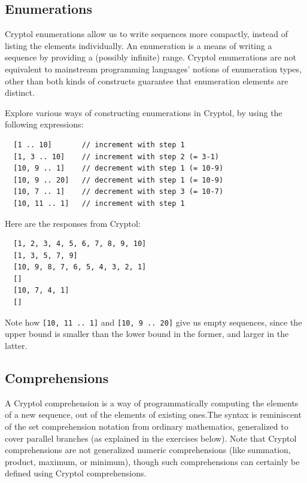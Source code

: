 \subsection{Enumerations}\indEnum
\label{sec:enumerations}

Cryptol enumerations allow us to write sequences more compactly,
instead of listing the elements individually.  An enumeration is a
means of writing a sequence by providing a (possibly infinite) range.
Cryptol enumerations are not equivalent to mainstream programming
languages' notions of enumeration types, other than both kinds of
constructs guarantee that enumeration elements are distinct.

\begin{Exercise}\label{ex:seq:3}
  Explore various ways of constructing enumerations in Cryptol, by
  using the following expressions:
\begin{Verbatim}
  [1 .. 10]       // increment with step 1
  [1, 3 .. 10]    // increment with step 2 (= 3-1)
  [10, 9 .. 1]    // decrement with step 1 (= 10-9)
  [10, 9 .. 20]   // decrement with step 1 (= 10-9)
  [10, 7 .. 1]    // decrement with step 3 (= 10-7)
  [10, 11 .. 1]   // increment with step 1
\end{Verbatim}
\end{Exercise}
\begin{Answer}
Here are the responses from Cryptol:
\begin{Verbatim}
  [1, 2, 3, 4, 5, 6, 7, 8, 9, 10]
  [1, 3, 5, 7, 9]
  [10, 9, 8, 7, 6, 5, 4, 3, 2, 1]
  []
  [10, 7, 4, 1]
  []
\end{Verbatim}
Note how {\tt [10, 11 .. 1]} and {\tt [10, 9 .. 20]} give us empty
sequences, since the upper bound is smaller than the lower bound in
the former, and larger in the latter.
\end{Answer}

\subsection{Comprehensions}\indComp
\label{sec:comprehensions}

A Cryptol comprehension is a way of programmatically computing the
elements of a new sequence, out of the elements of existing
ones.\indComp  The syntax is reminiscent of the set comprehension
notation from ordinary mathematics, generalized to cover parallel
branches (as explained in the exercises below).  Note that Cryptol
comprehensions are not generalized numeric comprehensions (like
summation, product, maximum, or minimum), though such comprehensions
can certainly be defined using Cryptol comprehensions.

